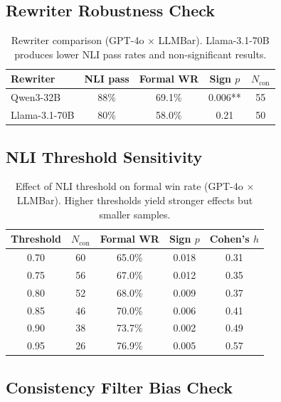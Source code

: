 \documentclass[11pt,a4paper]{article}
\begin{document}
\subsection{Rewriter Robustness Check}
\label{app:rewriter}

\begin{table}[h]
\centering
\small
\caption{Rewriter comparison (GPT-4o $\times$ LLMBar). Llama-3.1-70B produces lower NLI pass rates and non-significant results.}
\label{tab:rewriter}
\begin{tabular}{lcccc}
\toprule
\textbf{Rewriter} & \textbf{NLI pass} & \textbf{Formal WR} & \textbf{Sign $p$} & \textbf{$N_{\text{con}}$} \\
\midrule
Qwen3-32B & 88\% & 69.1\% & 0.006** & 55 \\
Llama-3.1-70B & 80\% & 58.0\% & 0.21 & 50 \\
\bottomrule
\end{tabular}
\end{table}

\subsection{NLI Threshold Sensitivity}
\label{app:nli_threshold}

\begin{table}[h]
\centering
\small
\caption{Effect of NLI threshold on formal win rate (GPT-4o $\times$ LLMBar). Higher thresholds yield stronger effects but smaller samples.}
\label{tab:nli_threshold}
\begin{tabular}{ccccc}
\toprule
\textbf{Threshold} & \textbf{$N_{\text{con}}$} & \textbf{Formal WR} & \textbf{Sign $p$} & \textbf{Cohen's $h$} \\
\midrule
0.70 & 60 & 65.0\% & 0.018 & 0.31 \\
0.75 & 56 & 67.0\% & 0.012 & 0.35 \\
0.80 & 52 & 68.0\% & 0.009 & 0.37 \\
0.85 & 46 & 70.0\% & 0.006 & 0.41 \\
0.90 & 38 & 73.7\% & 0.002 & 0.49 \\
0.95 & 26 & 76.9\% & 0.005 & 0.57 \\
\bottomrule
\end{tabular}
\end{table}

\subsection{Consistency Filter Bias Check}
\label{app:filter}
\end{document}
